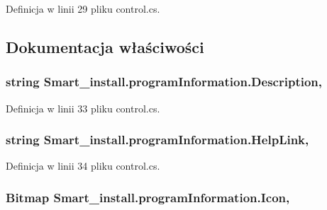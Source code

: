 Definicja w linii 29 pliku control.\+cs.



\subsection{Dokumentacja właściwości}
\hypertarget{class_smart__install_1_1program_information_a40f33801171766ccc6474b51686b8e7d}{
\subsubsection[{Description}]{\setlength{\rightskip}{0pt plus 5cm}string Smart\+\_\+install.\+program\+Information.\+Description\hspace{0.3cm}{\ttfamily [get]}, {\ttfamily [set]}}}\label{class_smart__install_1_1program_information_a40f33801171766ccc6474b51686b8e7d}


Definicja w linii 33 pliku control.\+cs.

\hypertarget{class_smart__install_1_1program_information_a9b1b6ba051cd616bed9cb3d22adff76f}{
\subsubsection[{Help\+Link}]{\setlength{\rightskip}{0pt plus 5cm}string Smart\+\_\+install.\+program\+Information.\+Help\+Link\hspace{0.3cm}{\ttfamily [get]}, {\ttfamily [set]}}}\label{class_smart__install_1_1program_information_a9b1b6ba051cd616bed9cb3d22adff76f}


Definicja w linii 34 pliku control.\+cs.

\hypertarget{class_smart__install_1_1program_information_a05501497d8922e8a4cce6d0205eba546}{
\subsubsection[{Icon}]{\setlength{\rightskip}{0pt plus 5cm}Bitmap Smart\+\_\+install.\+program\+Information.\+Icon\hspace{0.3cm}{\ttfamily [get]}, {\ttfamily [set]}}}\label{class_smart__install_1_1program_information_a05501497d8922e8a4cce6d0205eba546}


